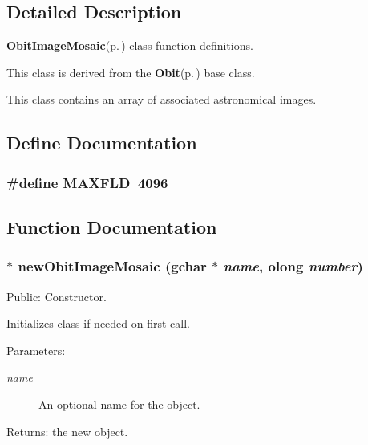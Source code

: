 \subsection{Detailed Description}
{\bf Obit\-Image\-Mosaic}{\rm (p.\,\pageref{structObitImageMosaic})} class function definitions. 

This class is derived from the {\bf Obit}{\rm (p.\,\pageref{structObit})} base class.

This class contains an array of associated astronomical images.

\subsection{Define Documentation}
\subsubsection{\setlength{\rightskip}{0pt plus 5cm}\#define MAXFLD\ 4096}\label{ObitImageMosaic_8c_a0}




\subsection{Function Documentation}
\subsubsection{$\ast$ new\-Obit\-Image\-Mosaic (gchar $\ast$ {\em name}, {\bf olong} {\em number})}\label{ObitImageMosaic_8c_a11}


Public: Constructor. 

Initializes class if needed on first call. \begin{Desc}
\item[Parameters:]
\begin{description}
\item[{\em name}]An optional name for the object. \end{description}
\end{Desc}
\begin{Desc}
\item[Returns:]the new object. \end{Desc}
